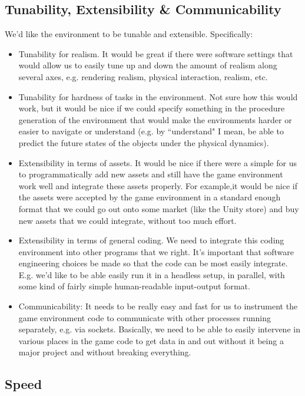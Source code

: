 \documentclass[12pt]{article}
\begin{document}
\subsection*{Tunability, Extensibility \& Communicability}

We'd like the environment to be tunable and extensible.   Specifically:
\begin{itemize}
  \item Tunability for realism.  It would be great if there were software settings that would allow us to easily tune up and down the amount of realism along several axes, e.g. rendering realism, physical interaction, realism, etc.   
  \item Tunability for hardness of tasks in the environment.  Not sure how this would work, but it would be nice if we could specify something in the procedure generation of the environment that would make the environments harder or easier to navigate or understand (e.g. by ``understand" I mean, be able to predict the future states of the objects under the physical dynamics). 
  \item Extensibility in terms of assets.  It would be nice if there were a simple for us to programmatically add new assets and still have the game environment work well and integrate these assets properly.  For example,it would be nice if the assets were accepted by the game environment in a standard enough format that we could go out onto some market (like the Unity store) and buy new assets that we could integrate, without too much effort.  
  \item Extensibility in terms of general coding.  We need to integrate this coding environment into other programs that we right.  It's important that software engineering choices be made so that the code can be most easily integrate.  E.g. we'd like to be able easily run it in a headless setup, in parallel, with some kind of fairly simple human-readable input-output format.   
  \item Communicability: It needs to be really easy and fast for us to instrument the game environment code to communicate with other processes running separately, e.g. via sockets.   Basically, we need to be able to easily intervene in various places in the game code to get data in and out without it being a major project and without breaking everything. 
\end{itemize}


\subsection*{Speed}
\end{document}
